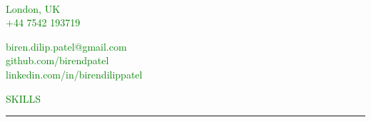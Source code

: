 \documentclass [
        11pt
] {article}
\begin{document}
\begin{multicols}{2}

\\
\noindent \textcolor{green}{London, UK}\\
\noindent \textcolor{green}{$+$44 7542 193719}\\

\columnbreak

\hspace*{\fill} \noindent \textcolor{green}{biren.dilip.patel@gmail.com}\\
\hspace*{\fill} \noindent \textcolor{green}{github.com/birendpatel}\\
\hspace*{\fill} \noindent \textcolor{green}{linkedin.com/in/birendilippatel}

\end{multicols}


\noindent\textcolor{green}{SKILLS \rule{17cm}{1pt}}

\begin{multicols}{4}

\\
\\
\\
\\

\columnbreak

\\
\\
\\
\\

\columnbreak

\\
\\
\\
\\

\columnbreak

\\
\\
\\

\\
\\
\\
\\

\end{multicols}
\end{document}
